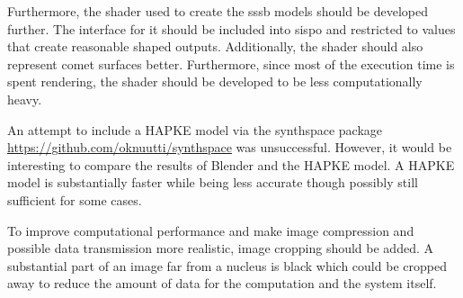 Furthermore, the shader used to create the \gls{sssb} models should be developed further. The interface for it should be included into \gls{sispo} and restricted to values that create reasonable shaped outputs. Additionally, the shader should also represent comet surfaces better. Furthermore, since most of the execution time is spent rendering, the shader should be developed to be less computationally heavy.

An attempt to include a HAPKE model via the synthspace package \url{https://github.com/oknuutti/synthspace} was unsuccessful. However, it would be interesting to compare the results of Blender and the HAPKE model. A HAPKE model is substantially faster while being less accurate though possibly still sufficient for some cases.

To improve computational performance and make image compression and possible data transmission more realistic, image cropping should be added. A substantial part of an image far from a nucleus is black which could be cropped away to reduce the amount of data for the computation and the system itself.